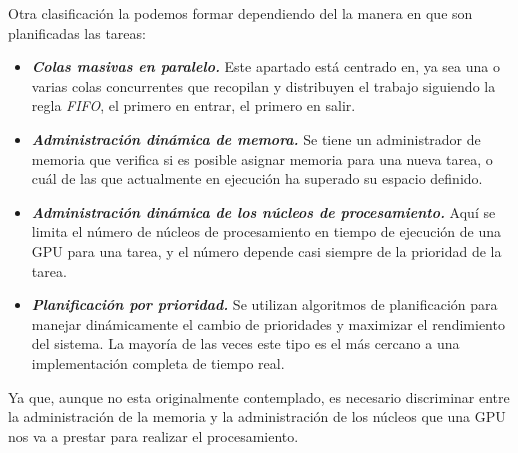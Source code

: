 \begin{itemize}
\begin{itemize}
	\end{itemize}




\end{itemize}

\vspace{0.3cm}
	
Otra clasificación la podemos formar dependiendo del la manera en que son planificadas las tareas:

\begin{itemize}

\item \textbf{\textit{Colas masivas en paralelo.}}
	Este apartado está centrado en, ya sea una o varias colas concurrentes que recopilan y distribuyen el trabajo siguiendo la regla \textit{FIFO}, el primero en entrar, el primero en salir. 
	
\item \textbf{\textit{Administración dinámica de memora.}}
	Se tiene un administrador de memoria que verifica si es posible asignar memoria para una nueva tarea, o cuál de las que actualmente en ejecución ha superado su espacio definido. 
	
\item \textbf{\textit{Administración dinámica de los núcleos de procesamiento.}}
	Aquí se limita el número de núcleos de procesamiento en tiempo de ejecución de una \acrshort{GPU} para una tarea, y el número depende casi siempre de la prioridad de la tarea.

	
\item \textbf{\textit{Planificación por prioridad.}}
	Se utilizan algoritmos de planificación para manejar dinámicamente el cambio de prioridades y maximizar el rendimiento del sistema. La mayoría de las veces este tipo es el más cercano a una implementación completa de tiempo real.
	
\end{itemize}
Ya que, aunque no esta originalmente contemplado, es necesario discriminar entre la administración de la memoria y la administración de los núcleos que una \acrshort{GPU} nos va a prestar para realizar el procesamiento.
    
